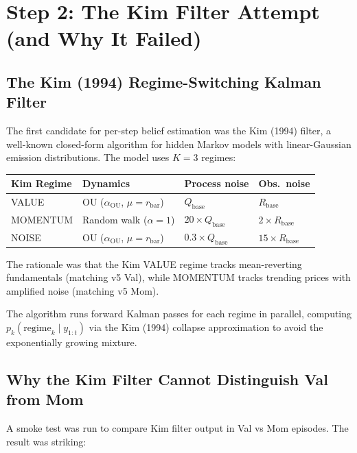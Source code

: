 \documentclass[11pt]{article}
\begin{document}
\section{Step 2: The Kim Filter Attempt (and Why It Failed)}

\subsection{The Kim (1994) Regime-Switching Kalman Filter}

The first candidate for per-step belief estimation was the Kim (1994) filter,
a well-known closed-form algorithm for hidden Markov models with
linear-Gaussian emission distributions.  The model uses $K=3$ regimes:

\begin{center}
\begin{tabular}{llll}
\toprule
\textbf{Kim Regime} & \textbf{Dynamics} & \textbf{Process noise} & \textbf{Obs.\ noise} \\
\midrule
VALUE    & OU ($\alpha_\text{OU}$, $\mu = r_\text{bar}$) & $Q_\text{base}$     & $R_\text{base}$ \\
MOMENTUM & Random walk ($\alpha = 1$)                     & $20 \times Q_\text{base}$ & $2 \times R_\text{base}$ \\
NOISE    & OU ($\alpha_\text{OU}$, $\mu = r_\text{bar}$) & $0.3 \times Q_\text{base}$ & $15 \times R_\text{base}$ \\
\bottomrule
\end{tabular}
\end{center}

\noindent
The rationale was that the Kim VALUE regime tracks mean-reverting fundamentals
(matching v5 Val), while MOMENTUM tracks trending prices with amplified noise
(matching v5 Mom).

The algorithm runs forward Kalman passes for each regime in parallel,
computing $p_k(\text{regime}_k \mid y_{1:t})$ via the Kim (1994) collapse
approximation to avoid the exponentially growing mixture.

\subsection{Why the Kim Filter Cannot Distinguish Val from Mom}

A smoke test was run to compare Kim filter output in Val vs Mom episodes.
The result was striking:
\end{document}

